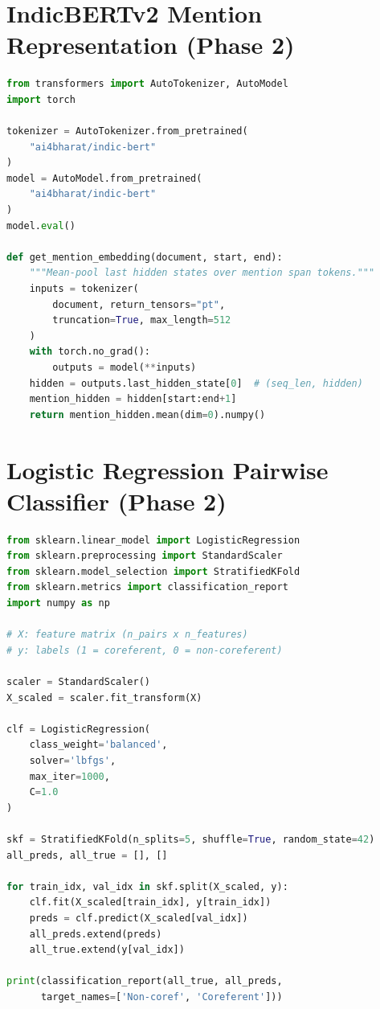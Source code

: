 \documentclass[12pt,a4paper]{report}
\begin{document}
\section{IndicBERTv2 Mention Representation (Phase 2)}

\begin{lstlisting}[language=Python, caption={Extracting Mention Embeddings from IndicBERTv2}]
from transformers import AutoTokenizer, AutoModel
import torch

tokenizer = AutoTokenizer.from_pretrained(
    "ai4bharat/indic-bert"
)
model = AutoModel.from_pretrained(
    "ai4bharat/indic-bert"
)
model.eval()

def get_mention_embedding(document, start, end):
    """Mean-pool last hidden states over mention span tokens."""
    inputs = tokenizer(
        document, return_tensors="pt",
        truncation=True, max_length=512
    )
    with torch.no_grad():
        outputs = model(**inputs)
    hidden = outputs.last_hidden_state[0]  # (seq_len, hidden)
    mention_hidden = hidden[start:end+1]
    return mention_hidden.mean(dim=0).numpy()
\end{lstlisting}

\section{Logistic Regression Pairwise Classifier (Phase 2)}

\begin{lstlisting}[language=Python, caption={Training the Pairwise Coreference Classifier}]
from sklearn.linear_model import LogisticRegression
from sklearn.preprocessing import StandardScaler
from sklearn.model_selection import StratifiedKFold
from sklearn.metrics import classification_report
import numpy as np

# X: feature matrix (n_pairs x n_features)
# y: labels (1 = coreferent, 0 = non-coreferent)

scaler = StandardScaler()
X_scaled = scaler.fit_transform(X)

clf = LogisticRegression(
    class_weight='balanced',
    solver='lbfgs',
    max_iter=1000,
    C=1.0
)

skf = StratifiedKFold(n_splits=5, shuffle=True, random_state=42)
all_preds, all_true = [], []

for train_idx, val_idx in skf.split(X_scaled, y):
    clf.fit(X_scaled[train_idx], y[train_idx])
    preds = clf.predict(X_scaled[val_idx])
    all_preds.extend(preds)
    all_true.extend(y[val_idx])

print(classification_report(all_true, all_preds,
      target_names=['Non-coref', 'Coreferent']))
\end{lstlisting}
\end{document}
